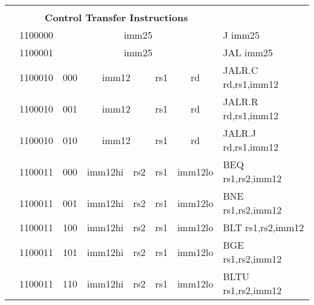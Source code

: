 \begin{table}[p]
\begin{small}
\begin{center}
\begin{tabular}{rcccccccccl}
&
\multicolumn{9}{c}{} & \\
&
\multicolumn{9}{c}{\bf Control Transfer Instructions} & \\
\cline{2-10}
  

&
\multicolumn{1}{|c|}{1100000} &
\multicolumn{8}{c|}{imm25} & J imm25 \\
\cline{2-10}
  

&
\multicolumn{1}{|c|}{1100001} &
\multicolumn{8}{c|}{imm25} & JAL imm25 \\
\cline{2-10}
  

&
\multicolumn{1}{|c|}{1100010} &
\multicolumn{2}{c|}{000} &
\multicolumn{4}{c|}{imm12} &
\multicolumn{1}{c|}{rs1} &
\multicolumn{1}{c|}{rd} & JALR.C rd,rs1,imm12 \\
\cline{2-10}
  

&
\multicolumn{1}{|c|}{1100010} &
\multicolumn{2}{c|}{001} &
\multicolumn{4}{c|}{imm12} &
\multicolumn{1}{c|}{rs1} &
\multicolumn{1}{c|}{rd} & JALR.R rd,rs1,imm12 \\
\cline{2-10}
  

&
\multicolumn{1}{|c|}{1100010} &
\multicolumn{2}{c|}{010} &
\multicolumn{4}{c|}{imm12} &
\multicolumn{1}{c|}{rs1} &
\multicolumn{1}{c|}{rd} & JALR.J rd,rs1,imm12 \\
\cline{2-10}
  

&
\multicolumn{1}{|c|}{1100011} &
\multicolumn{2}{c|}{000} &
\multicolumn{3}{c|}{imm12hi} &
\multicolumn{1}{c|}{rs2} &
\multicolumn{1}{c|}{rs1} &
\multicolumn{1}{c|}{imm12lo} & BEQ rs1,rs2,imm12 \\
\cline{2-10}
  

&
\multicolumn{1}{|c|}{1100011} &
\multicolumn{2}{c|}{001} &
\multicolumn{3}{c|}{imm12hi} &
\multicolumn{1}{c|}{rs2} &
\multicolumn{1}{c|}{rs1} &
\multicolumn{1}{c|}{imm12lo} & BNE rs1,rs2,imm12 \\
\cline{2-10}
  

&
\multicolumn{1}{|c|}{1100011} &
\multicolumn{2}{c|}{100} &
\multicolumn{3}{c|}{imm12hi} &
\multicolumn{1}{c|}{rs2} &
\multicolumn{1}{c|}{rs1} &
\multicolumn{1}{c|}{imm12lo} & BLT rs1,rs2,imm12 \\
\cline{2-10}
  

&
\multicolumn{1}{|c|}{1100011} &
\multicolumn{2}{c|}{101} &
\multicolumn{3}{c|}{imm12hi} &
\multicolumn{1}{c|}{rs2} &
\multicolumn{1}{c|}{rs1} &
\multicolumn{1}{c|}{imm12lo} & BGE rs1,rs2,imm12 \\
\cline{2-10}
  

&
\multicolumn{1}{|c|}{1100011} &
\multicolumn{2}{c|}{110} &
\multicolumn{3}{c|}{imm12hi} &
\multicolumn{1}{c|}{rs2} &
\multicolumn{1}{c|}{rs1} &
\multicolumn{1}{c|}{imm12lo} & BLTU rs1,rs2,imm12 \\
\cline{2-10}
  


\end{tabular}
\end{center}
\end{small}
\end{table}
